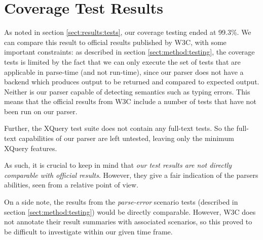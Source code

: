 \section{Coverage Test Results}
\label{sect:discussion:coverageResults}
As noted in section \ref{sect:results:tests}, our coverage testing ended at 
99.3\%. We can compare this result to official results published by W3C, with
some  important constraints: as described in section \ref{sect:method:testing},
the coverage tests is limited by the fact that we can only execute the set of
tests that are applicable in parse-time (and not run-time), since our parser
does not have a backend which produces output to be returned and compared to
expected output. Neither is our parser capable of detecting semantics such as
typing errors. This means that the official results from W3C include a number
of tests that have not been run on our parser.

Further, the XQuery test suite does not contain any full-text tests. So the
full-text capabilities of our parser are left untested, leaving only the minimum
XQuery features.

As such, it is crucial to keep in mind that \emph{our test results are not directly
comparable with official results}. However, they give a fair indication of the
parsers abilities, seen from a relative point of view.

On a side note, the results from the \emph{parse-error} scenario tests
(described in  section \ref{sect:method:testing}) would be directly comparable.
However, W3C does not annotate their result summaries with associated scenarios,
so this proved to be difficult to investigate within our given time frame.

